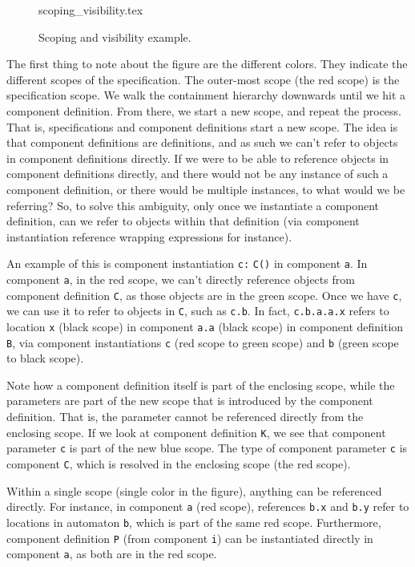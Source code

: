 \documentclass{report}
\begin{document}
\begin{figure}
  \centering
  {scoping_visibility.tex}
  \caption{Scoping and visibility example.}
  \label{fig:scoping-visibility}
\end{figure}

The first thing to note about the figure are the different colors. They
indicate the different scopes of the specification. The outer-most scope (the
red scope) is the specification scope. We walk the containment hierarchy
downwards until we hit a component definition. From there, we start a new
scope, and repeat the process. That is, specifications and component
definitions start a new scope. The idea is that component definitions are
definitions, and as such we can't refer to objects in component definitions
directly. If we were to be able to reference objects in component definitions
directly, and there would not be any instance of such a component definition,
or there would be multiple instances, to what would we be referring? So, to
solve this ambiguity, only once we instantiate a component definition, can we
refer to objects within that definition (via component instantiation reference
wrapping expressions for instance).

An example of this is component
instantiation \texttt{c:} \texttt{C()} in component \texttt{a}. In component
\texttt{a}, in the red scope, we can't directly reference objects from
component definition \texttt{C}, as those objects are in the green scope. Once
we have \texttt{c}, we can use it to refer to objects in \texttt{C}, such
as \texttt{c.b}. In fact, \texttt{c.b.a.a.x} refers to location \texttt{x}
(black scope) in component \texttt{a.a} (black scope) in component definition
\texttt{B}, via component instantiations \texttt{c} (red scope to green scope)
and \texttt{b} (green scope to black scope).

Note how a component definition itself is part of the enclosing scope, while
the parameters are part of the new scope that is introduced by the component
definition. That is, the parameter cannot be referenced directly from the
enclosing scope. If we look at component definition \texttt{K}, we see that
component parameter \texttt{c} is part of the new blue scope. The type of
component parameter \texttt{c} is component \texttt{C}, which is resolved
in the enclosing scope (the red scope).

Within a single scope (single color in the figure), anything can be referenced
directly. For instance, in component \texttt{a} (red scope), references
\texttt{b.x} and \texttt{b.y} refer to locations in automaton \texttt{b},
which is part of the same red scope. Furthermore, component definition
\texttt{P} (from component \texttt{i}) can be instantiated directly in
component \texttt{a}, as both are in the red scope.
\end{document}
